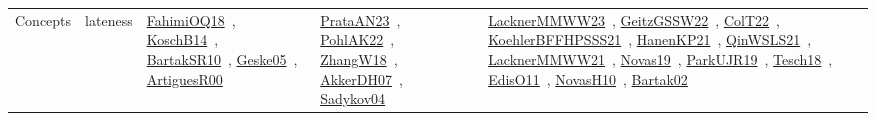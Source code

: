 {\begin{longtable}{lp{3cm}>{\raggedright\arraybackslash}p{6cm}>{\raggedright\arraybackslash}p{6cm}>{\raggedright\arraybackslash}p{8cm}}
Concepts & lateness & \href{articles/FahimiOQ18.pdf}{FahimiOQ18}~\cite{FahimiOQ18}, \href{papers/KoschB14.pdf}{KoschB14}~\cite{KoschB14}, \href{articles/BartakSR10.pdf}{BartakSR10}~\cite{BartakSR10}, \href{papers/Geske05.pdf}{Geske05}~\cite{Geske05}, \href{articles/ArtiguesR00.pdf}{ArtiguesR00}~\cite{ArtiguesR00} & \href{articles/PrataAN23.pdf}{PrataAN23}~\cite{PrataAN23}, \href{articles/PohlAK22.pdf}{PohlAK22}~\cite{PohlAK22}, \href{articles/ZhangW18.pdf}{ZhangW18}~\cite{ZhangW18}, \href{papers/AkkerDH07.pdf}{AkkerDH07}~\cite{AkkerDH07}, \href{papers/Sadykov04.pdf}{Sadykov04}~\cite{Sadykov04} & \href{articles/LacknerMMWW23.pdf}{LacknerMMWW23}~\cite{LacknerMMWW23}, \href{papers/GeitzGSSW22.pdf}{GeitzGSSW22}~\cite{GeitzGSSW22}, \href{articles/ColT22.pdf}{ColT22}~\cite{ColT22}, \href{articles/KoehlerBFFHPSSS21.pdf}{KoehlerBFFHPSSS21}~\cite{KoehlerBFFHPSSS21}, \href{papers/HanenKP21.pdf}{HanenKP21}~\cite{HanenKP21}, \href{articles/QinWSLS21.pdf}{QinWSLS21}~\cite{QinWSLS21}, \href{papers/LacknerMMWW21.pdf}{LacknerMMWW21}~\cite{LacknerMMWW21}, \href{articles/Novas19.pdf}{Novas19}~\cite{Novas19}, \href{papers/ParkUJR19.pdf}{ParkUJR19}~\cite{ParkUJR19}, \href{papers/Tesch18.pdf}{Tesch18}~\cite{Tesch18}, \href{papers/EdisO11.pdf}{EdisO11}~\cite{EdisO11}, \href{articles/NovasH10.pdf}{NovasH10}~\cite{NovasH10}, \href{papers/Bartak02.pdf}{Bartak02}~\cite{Bartak02}\\

\end{longtable}}
